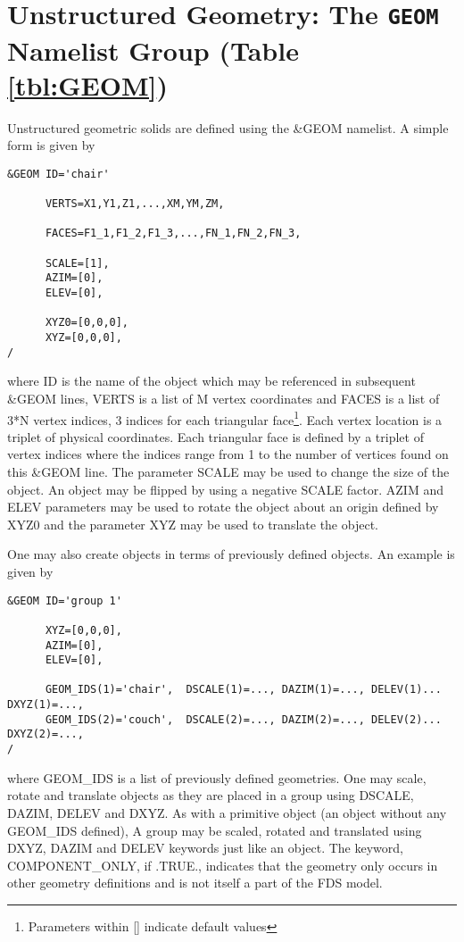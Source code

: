 \documentclass[12pt]{article}
\begin{document}
\vspace{1.0in}
\section{Unstructured Geometry: The \texorpdfstring{{\tt GEOM}}{GEOM} Namelist Group (Table \ref{tbl:GEOM})}
\label{info:GEOM}

Unstructured geometric solids are defined using the \&GEOM namelist.
A simple form is given by

\begin{verbatim}
&GEOM ID='chair'

      VERTS=X1,Y1,Z1,...,XM,YM,ZM,

      FACES=F1_1,F1_2,F1_3,...,FN_1,FN_2,FN_3,

      SCALE=[1],
      AZIM=[0],
      ELEV=[0],

      XYZ0=[0,0,0],
      XYZ=[0,0,0],
/
\end{verbatim}

\noindent where ID is the name of the object which may be referenced in subsequent \&GEOM lines, VERTS is a list of M vertex coordinates and FACES is a list of 3*N vertex indices, 3 indices for each triangular face\footnote{Parameters within [] indicate default values}.  Each vertex location is a triplet of physical coordinates.  Each triangular face is defined by a triplet of vertex indices where the indices range from 1 to the number of vertices found on this \&GEOM line. The parameter SCALE may be used to change the size of the object. An object may be flipped by using a negative SCALE factor.  AZIM and ELEV parameters may be used to rotate the object about an origin defined by XYZ0 and the parameter XYZ may be used to translate the object.

One may also create objects in terms of previously defined objects.  An example is given by

\begin{verbatim}
&GEOM ID='group 1'

      XYZ=[0,0,0],
      AZIM=[0],
      ELEV=[0],

      GEOM_IDS(1)='chair',  DSCALE(1)=..., DAZIM(1)=..., DELEV(1)... DXYZ(1)=...,
      GEOM_IDS(2)='couch',  DSCALE(2)=..., DAZIM(2)=..., DELEV(2)... DXYZ(2)=...,
/
\end{verbatim}

\noindent where GEOM\_IDS is a list of previously defined geometries.   One may scale, rotate and translate objects as they are placed in a group using DSCALE, DAZIM, DELEV and DXYZ.  As with a primitive object (an object without any GEOM\_IDS defined), A group may be scaled, rotated and translated using DXYZ, DAZIM and DELEV keywords just like an object.
The keyword, COMPONENT\_ONLY, if .TRUE., indicates that the geometry only occurs in other geometry definitions and is not itself a part of the FDS model.
\end{document}
